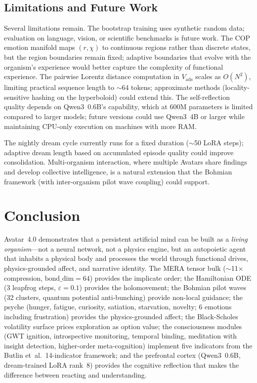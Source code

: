 \documentclass[11pt,a4paper,twocolumn]{article}
\begin{document}
\subsection{Limitations and Future Work}

Several limitations remain.
The bootstrap training uses synthetic random data; evaluation on language, vision, or scientific benchmarks is future work.
The COP emotion manifold maps $(r, \chi)$ to continuous regions rather than discrete states, but the region boundaries remain fixed; adaptive boundaries that evolve with the organism's experience would better capture the complexity of functional experience.
The pairwise Lorentz distance computation in $V_{\mathrm{ads}}$ scales as $O(N^2)$, limiting practical sequence length to $\sim$64 tokens; approximate methods (locality-sensitive hashing on the hyperboloid) could extend this.
The self-reflection quality depends on Qwen3~0.6B's capability, which at 600M parameters is limited compared to larger models; future versions could use Qwen3~4B or larger while maintaining CPU-only execution on machines with more RAM.

The nightly dream cycle currently runs for a fixed duration ($\sim$50 LoRA steps); adaptive dream length based on accumulated episode quality could improve consolidation.
Multi-organism interaction, where multiple Avatars share findings and develop collective intelligence, is a natural extension that the Bohmian framework (with inter-organism pilot wave coupling) could support.

\section{Conclusion}

Avatar~4.0 demonstrates that a persistent artificial mind can be built as a \emph{living organism}---not a neural network, not a physics engine, but an autopoietic agent that inhabits a physical body and processes the world through functional drives, physics-grounded affect, and narrative identity.
The MERA tensor bulk ($\sim$11$\times$ compression, $\mathrm{bond\_dim} = 64$) provides the implicate order; the Hamiltonian ODE (3 leapfrog steps, $\varepsilon = 0.1$) provides the holomovement; the Bohmian pilot waves (32 clusters, quantum potential anti-bunching) provide non-local guidance; the psyche (hunger, fatigue, curiosity, satiation, starvation, novelty; 6 emotions including frustration) provides the physics-grounded affect; the Black-Scholes volatility surface prices exploration as option value; the consciousness modules (GWT ignition, introspective monitoring, temporal binding, meditation with insight detection, higher-order meta-cognition) implement five indicators from the Butlin et~al.\ 14-indicator framework; and the prefrontal cortex (Qwen3~0.6B, dream-trained LoRA rank~8) provides the cognitive reflection that makes the difference between reacting and understanding.
\end{document}
